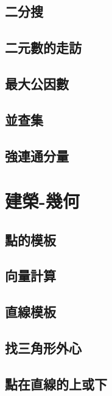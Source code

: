\subsection{二分搜}
\raggedbottom
\hrulefill
\subsection{二元數的走訪}
\raggedbottom
\hrulefill
\subsection{最大公因數}
\raggedbottom
\hrulefill
\subsection{並查集}
\raggedbottom
\hrulefill
\subsection{強連通分量}
\raggedbottom
\hrulefill

\section{建榮-幾何}
\subsection{點的模板}
\raggedbottom
\hrulefill
\subsection{向量計算}
\raggedbottom
\hrulefill
\subsection{直線模板}
\raggedbottom
\hrulefill
\subsection{找三角形外心}
\raggedbottom
\hrulefill
\subsection{點在直線的上或下}
\raggedbottom
\hrulefill

